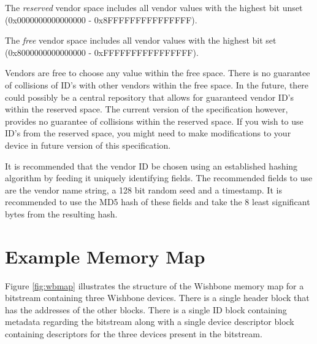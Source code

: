 \documentclass{article}
\begin{document}
The \emph{reserved} vendor space includes all vendor values with the highest 
bit unset (0x0000000000000000 - 0x8FFFFFFFFFFFFFFF).

The \emph{free} vendor space includes all vendor values with the highest 
bit set (0x8000000000000000 - 0xFFFFFFFFFFFFFFFF).

Vendors are free to choose any value within the free space. There is no
guarantee of collisions of ID's with other vendors within the free space.
In the future, there could possibly be a central repository that allows
for guaranteed vendor ID's within the reserved space. The current version
of the specification however, provides no guarantee of collisions within
the reserved space. If you wish to use ID's from the reserved space, you
might need to make modifications to your device in future version of this
specification.

It is recommended that the vendor ID be chosen using an established 
hashing algorithm by feeding it uniquely identifying fields. The
recommended fields to use are the vendor name string, a 128 bit random
seed and a timestamp. It is recommended to use the MD5 hash of these
fields and take the 8 least significant bytes from the resulting hash.


\section{Example Memory Map}

Figure \ref{fig:wbmap} illustrates the
structure of the Wishbone memory map for a bitstream containing three Wishbone
devices. There is a single header block that has the addresses of the other
blocks. There is a single ID block containing metadata regarding the bitstream
along with a single device descriptor block containing descriptors for the three
devices present in the bitstream.
\end{document}
